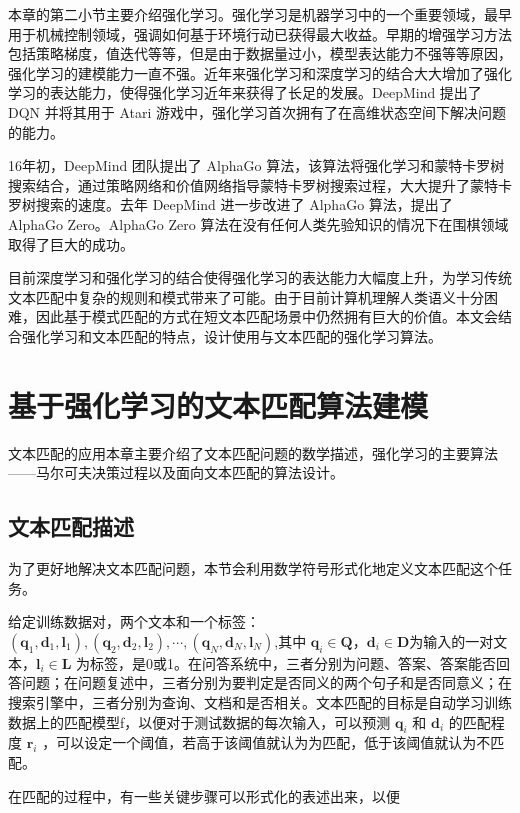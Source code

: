 本章的第二小节主要介绍强化学习。强化学习是机器学习中的一个重要领域，最早用于机械控制领域，强调如何基于环境行动已获得最大收益。早期的增强学习方法包括策略梯度，值迭代等等，但是由于数据量过小，模型表达能力不强等等原因，强化学习的建模能力一直不强。近年来强化学习和深度学习的结合大大增加了强化学习的表达能力，使得强化学习近年来获得了长足的发展。DeepMind 提出了 DQN 并将其用于 Atari 游戏中，强化学习首次拥有了在高维状态空间下解决问题的能力。

16年初，DeepMind 团队提出了 AlphaGo 算法，该算法将强化学习和蒙特卡罗树搜索结合，通过策略网络和价值网络指导蒙特卡罗树搜索过程，大大提升了蒙特卡罗树搜索的速度。去年 DeepMind 进一步改进了 AlphaGo 算法，提出了 AlphaGo Zero。AlphaGo Zero 算法在没有任何人类先验知识的情况下在围棋领域取得了巨大的成功。

目前深度学习和强化学习的结合使得强化学习的表达能力大幅度上升，为学习传统文本匹配中复杂的规则和模式带来了可能。由于目前计算机理解人类语义十分困难，因此基于模式匹配的方式在短文本匹配场景中仍然拥有巨大的价值。本文会结合强化学习和文本匹配的特点，设计使用与文本匹配的强化学习算法。

\chapter{基于强化学习的文本匹配算法建模}
文本匹配的应用本章主要介绍了文本匹配问题的数学描述，强化学习的主要算法——马尔可夫决策过程以及面向文本匹配的算法设计。
\section{文本匹配描述}
为了更好地解决文本匹配问题，本节会利用数学符号形式化地定义文本匹配这个任务。

给定训练数据对，两个文本和一个标签： $(\mathbf{q}_1, \mathbf{d}_1, \mathbf{l}_1), (\mathbf{q}_2, \mathbf{d}_2, \mathbf{l}_2), \cdots, (\mathbf{q}_N, \mathbf{d}_N, \mathbf{l}_N)$,其中 $\mathbf{q}_i \in \mathbf{Q}$，$\mathbf{d}_i \in \mathbf{D}$为输入的一对文本，$\mathbf{l}_i \in \mathbf{L}$ 为标签，是0或1。在问答系统中，三者分别为问题、答案、答案能否回答问题；在问题复述中，三者分别为要判定是否同义的两个句子和是否同意义；在搜索引擎中，三者分别为查询、文档和是否相关。文本匹配的目标是自动学习训练数据上的匹配模型f，以便对于测试数据的每次输入，可以预测 $\mathbf{q}_i$ 和 $\mathbf{d}_i$ 的匹配程度 $\mathbf{r}_i$ ，可以设定一个阈值，若高于该阈值就认为为匹配，低于该阈值就认为不匹配。

在匹配的过程中，有一些关键步骤可以形式化的表述出来，以便

